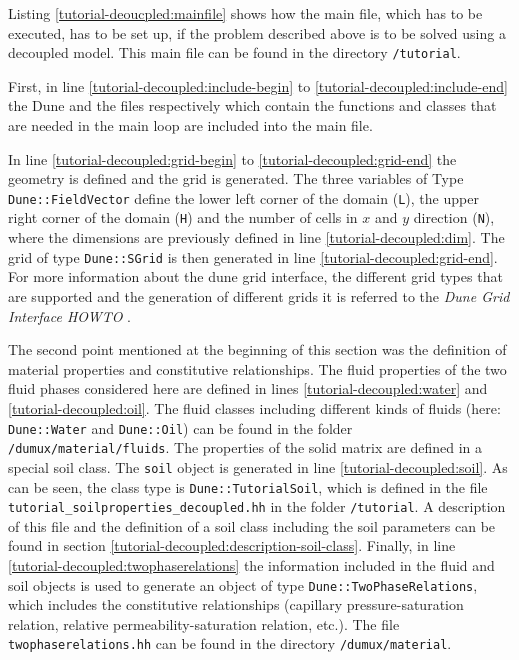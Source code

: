 Listing \ref{tutorial-deoucpled:mainfile} shows how the main file, which has to be executed, has to be set up, if the problem described above is to be solved using a decoupled model. This main file can be found in the directory \texttt{/tutorial}.

\begin{lst}\label{tutorial-deoucpled:mainfile} \mbox{}

\end{lst}

First, in line \ref{tutorial-decoupled:include-begin} to \ref{tutorial-decoupled:include-end} the Dune and the \Dumux files respectively which contain the functions and classes that are needed in the main loop are included into the main file.

In line \ref{tutorial-decoupled:grid-begin} to \ref{tutorial-decoupled:grid-end} the geometry is defined and the grid is generated. The three variables of Type \texttt{Dune::FieldVector} define the lower left corner of the domain (\texttt{L}), the upper right corner of the domain (\texttt{H}) and the number of cells in $x$ and $y$ direction (\texttt{N}), where the dimensions are previously defined in line \ref{tutorial-decoupled:dim}. The grid of type \texttt{Dune::SGrid} is then generated in line \ref{tutorial-decoupled:grid-end}. For more information about the dune grid interface, the different grid types that are supported and the generation of different grids it is referred to the \textit{Dune Grid Interface HOWTO} \cite{DUNE-HP}.

The second point mentioned at the beginning of this section was the
definition of material properties and constitutive relationships. The
fluid properties of the two fluid phases considered here are defined
in lines \ref{tutorial-decoupled:water} and
\ref{tutorial-decoupled:oil}. The fluid classes including different
kinds of fluids (here: \texttt{Dune::Water} and \texttt{Dune::Oil})
can be found in the folder \texttt{/dumux/material/fluids}. The
properties of the solid matrix are defined in a special soil
class. The \texttt{soil} object is generated in line
\ref{tutorial-decoupled:soil}. As can be seen, the class type is
\texttt{Dune::TutorialSoil}, which is defined in the file
\texttt{tutorial\_soilproperties\_decoupled.hh} in the folder
\texttt{/tutorial}. A description of this file and the definition of a
soil class including the soil parameters can be found in section
\ref{tutorial-decoupled:description-soil-class}. Finally, in line
\ref{tutorial-decoupled:twophaserelations} the information included in
the fluid and soil objects is used to generate an object of type
\texttt{Dune::TwoPhaseRelations}, which includes the constitutive
relationships (capillary pressure-saturation relation, relative
permeability-saturation relation, etc.). The file
\texttt{twophaserelations.hh} can be found in the directory
\texttt{/dumux/material}.

